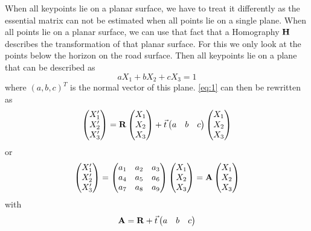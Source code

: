 When all keypoints lie on a planar surface, we have to treat it differently as the essential matrix can not be estimated when all points lie on a single plane. When all points lie on a planar surface, we can use that fact that a Homography $\mathbf{H}$ describes the transformation of that planar surface. For this we only look at the points below the horizon on the road surface. Then all keypoints lie on a plane that can be described as
\begin{equation}
    aX_1 + bX_2 + cX_3 = 1
\end{equation}
where $(a, b, c)^T$ is the normal vector of this plane. \autoref{eq:1} can then be rewritten as 
\begin{equation}
    \begin{pmatrix}
        X_1' \\
        X_2' \\
        X_3'
    \end{pmatrix} = \mathbf{R}
    \begin{pmatrix}
        X_1 \\
        X_2 \\
        X_3
    \end{pmatrix} + \vec t
    \begin{pmatrix}
        a & b & c
    \end{pmatrix}
    \begin{pmatrix}
        X_1 \\
        X_2 \\
        X_3
    \end{pmatrix}
\end{equation}
or
\begin{equation}
    \begin{pmatrix}
        X_1' \\
        X_2' \\
        X_3'
    \end{pmatrix} =
    \begin{pmatrix}
        a_1 & a_2 & a_3 \\
        a_4 & a_5 & a_6 \\
        a_7 & a_8 & a_9 \\
    \end{pmatrix}
    \begin{pmatrix}
        X_1 \\
        X_2 \\
        X_3
    \end{pmatrix} = \mathbf{A}
    \begin{pmatrix}
        X_1 \\
        X_2 \\
        X_3
    \end{pmatrix}
\end{equation}
with
\begin{equation} \label{eq:matrixA}
    \mathbf{A} = \mathbf{R} + \vec t
    \begin{pmatrix}
        a & b & c
    \end{pmatrix}
\end{equation}

